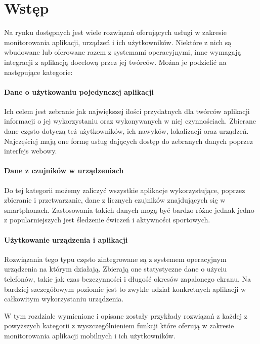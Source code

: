 \section{Wstęp}
Na rynku dostępnych jest wiele rozwiązań oferujących usługi w zakresie monitorowania aplikacji, urządzeń i ich użytkowników. Niektóre z nich są wbudowane lub oferowane razem z systemami operacyjnymi, inne wymagają integracji z aplikacją docelową przez jej twórców. Można je podzielić na następujące kategorie:

\paragraph{Dane o użytkowaniu pojedynczej aplikacji} 
Ich celem jest zebranie jak największej ilości przydatnych dla twórców aplikacji informacji o jej wykorzystaniu oraz wykonywanych w niej czynnościach. Zbierane dane często dotyczą też użytkowników, ich nawyków, lokalizacji oraz urządzeń. Najczęściej mają one formę usług dających dostęp do zebranych danych poprzez interfejs webowy. 

\paragraph{Dane z czujników w urządzeniach} 
Do tej kategorii możemy zaliczyć wszystkie aplikacje wykorzystujące, poprzez zbieranie i przetwarzanie, dane z licznych czujników znajdujących się w smartphonach. Zastosowania takich danych mogą być bardzo różne jednak jedno z popularniejszych jest śledzenie ćwiczeń i aktywności sportowych.

\paragraph{Użytkowanie urządzenia i aplikacji} 
Rozwiązania tego typu często zintegrowane są z systemem operacyjnym urządzenia na którym działają. Zbierają one statystyczne dane o użyciu telefonów, takie jak czas bezczynności i długość okresów zapalonego ekranu. Na bardziej szczegółowym poziomie jest to zwykle udział konkretnych aplikacji w całkowitym wykorzystaniu urządzenia.
\bigskip

W tym rozdziale wymienione i opisane zostały przykłady rozwiązań z każdej z powyższych kategorii z wyszczególnieniem funkcji które oferują w zakresie monitorowania aplikacji mobilnych i ich użytkowników.
